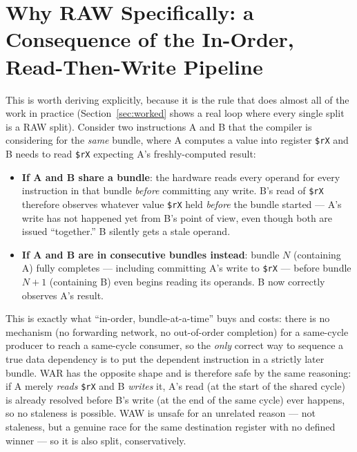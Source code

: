 \documentclass[11pt,a4paper]{article}
\begin{document}
\section{Why RAW Specifically: a Consequence of the In-Order, Read-Then-Write Pipeline}
\label{sec:raw}

This is worth deriving explicitly, because it is the rule that does almost all of the
work in practice (Section~\ref{sec:worked} shows a real loop where every single split is
a RAW split). Consider two instructions A and B that the compiler is considering for the
\emph{same} bundle, where A computes a value into register \texttt{\$rX} and B needs to
read \texttt{\$rX} expecting A's freshly-computed result:

\begin{itemize}
  \item \textbf{If A and B share a bundle}: the hardware reads every operand for every
        instruction in that bundle \emph{before} committing any write. B's read of
        \texttt{\$rX} therefore observes whatever value \texttt{\$rX} held \emph{before}
        the bundle started --- A's write has not happened yet from B's point of view,
        even though both are issued ``together.'' B silently gets a stale operand.
  \item \textbf{If A and B are in consecutive bundles instead}: bundle $N$ (containing A)
        fully completes --- including committing A's write to \texttt{\$rX} --- before
        bundle $N+1$ (containing B) even begins reading its operands. B now correctly
        observes A's result.
\end{itemize}

This is exactly what ``in-order, bundle-at-a-time'' buys and costs: there is no mechanism
(no forwarding network, no out-of-order completion) for a same-cycle producer to reach a
same-cycle consumer, so the \emph{only} correct way to sequence a true data dependency is
to put the dependent instruction in a strictly later bundle. WAR has the opposite shape and
is therefore safe by the same reasoning: if A merely \emph{reads} \texttt{\$rX} and B
\emph{writes} it, A's read (at the start of the shared cycle) is already resolved before
B's write (at the end of the same cycle) ever happens, so no staleness is possible. WAW is
unsafe for an unrelated reason --- not staleness, but a genuine race for the same
destination register with no defined winner --- so it is also split, conservatively.
\end{document}
